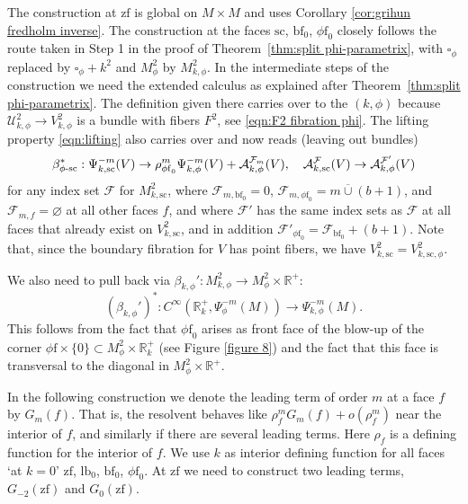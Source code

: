 \documentclass[JEP,XML,SOM,Unicode,NoFloatCountersInSection,published]{cedram}
\newcommand{\phisc}{{\phi\textup{-}\ssc}}
\theoremstyle{plain}
\theoremstyle{definition}
\newcommand{\R}{{\mathbb{R}}}
\newcommand{\Umath}{{\mathscr{U}}}
\newcommand\calA{{\mathcal A}}
\newcommand\calF{{\mathcal F}}
\newcommand{\phif}{{\phi\mathrm{f}}}
\newcommand{\lf}{{\mathrm{lb}}}
\newcommand{\bbf}{{\mathrm{bf}}}
\newcommand{\ssc}{{\mathrm{sc}}}
\newcommand{\zf}{{\mathrm{zf}}}
\newcommand{\ocup}{\mathbin{\overline{\cup}}}
\begin{document}
The construction at $\zf$ is global on $M\times M$ and uses Corollary \ref{cor:grihun fredholm inverse}. The construction at the faces $\ssc$, $\bbf_0$, $\phif_0$ closely follows the route taken in Step 1 in the proof of Theorem~\ref{thm:split phi-parametrix}, with $\square_\phi$ replaced by $\square_\phi+k^2$ and $M^2_\phi$ by $M^2_{k,\phi}$.
In the intermediate steps of the construction we need the extended calculus as explained after Theorem~\ref{thm:split phi-parametrix}. The definition given there carries over to the $(k,\phi)$ because $\Umath^2_{k,\phi}\to V^2_{k,\phi}$ is a bundle with fibers $F^2$, see \eqref{eqn:F2 fibration phi}. The lifting property \eqref{eqn:lifting} also carries over and now reads (leaving out bundles)
\begin{equation}
\label{eqn:lifting k phi}
\beta_{\phisc}^*: \Psi_{k,\ssc}^{-m}(V) \to \rho_{\phif_0}^m\Psi_{k,\phi}^{-m}(V)+\calA_{k,\phi}^{\calF_m}(V),
\quad \calA_{k,\ssc}^{\calF}(V) \to \calA_{k,\phi}^{\calF'}(V)
\end{equation}
for any index set $\calF$ for $M^2_{k,\ssc}$,
where $\calF_{m,\bbf_0}=0$, $\calF_{m,{\phif_0}}=m \ocup (b+1)$, and
$\calF_{m,f}=\varnothing$ at all other faces $f$, and where $\calF'$ has the same index sets as
$\calF$ at all faces that already exist on $V^2_{k,\ssc}$, and in addition $\calF'_{\phif_0} = \calF_{\bbf_0}+(b+1)$. Note that, since the boundary fibration for $V$ has point fibers, we have $V^2_{k,\ssc}= V^2_{k,\ssc,\phi}$.

We also need to pull back via $\beta_{k,\phi}':M^2_{k,\phi}\to M^2_\phi \times \R^+$:
\begin{equation}
\label{eqn:lifting k phi2}
(\beta_{k,\phi}')^*: C^\infty(\R^{+}_{k},\Psi^{-m}_\phi(M)) \to \Psi^{-m}_{k,\phi}(M).
\end{equation}
This follows from the fact that $\phif_0$ arises as front face of the blow-up of the corner
$\phif\times\{0\}\subset M^2_\phi\times\R^{+}_{k}$ (see Figure \ref{figure 8}) and the fact that this face is transversal to the diagonal in $M^2_\phi\times\R^+$.

In the following construction we denote the leading term of order $m$ at a face $f$ by $G_m(f)$. That is, the resolvent behaves like $\rho_f^m G_m(f) + o(\rho_f^m)$ near the interior of $f$, and similarly if there are several leading terms. Here $\rho_f$ is a defining function for the interior of $f$. We use $k$ as interior defining function for all faces `at $k=0$' \ie $\zf$, $\lf_0$, $\bbf_0$, $\phif_0$.
At $\zf$ we need to construct two leading terms, $G_{-2}(\zf)$ and $G_0(\zf)$.
\end{document}

